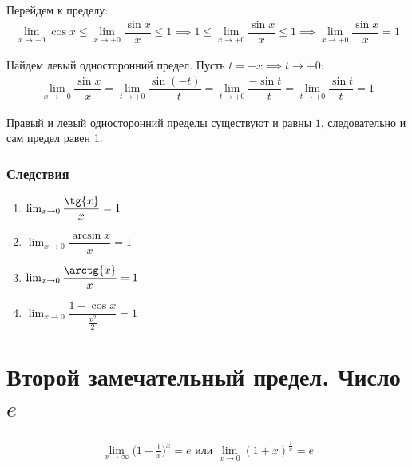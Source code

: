 \documentclass[a4paper,12pt,oneside]{extbook}
\theoremstyle{numbered}
\theoremstyle{unnumbered}
\theoremstyle{named}
\theoremstyle{unnumbered}
\theoremstyle{named}
\theoremstyle{named}
\theoremstyle{named}
\begin{document}
Перейдем к пределу:
\begin{gather*}
    \lim_{x \to +0}{\cos{x}} \leq \lim_{x \to +0}{\dfrac{\sin{x}}{x}} \leq 1 \implies 1 \leq \lim_{x \to +0}{\dfrac{\sin{x}}{x}} \leq 1 \implies \lim_{x \to +0}{\dfrac{\sin{x}}{x}} = 1
\end{gather*}

Найдем левый односторонний предел. Пусть \(t = -x \implies t \to +0\):
\begin{gather*}
    \lim_{x \to -0}{\dfrac{\sin{x}}{x}} = \lim_{t \to +0}{\dfrac{\sin{(-t)}}{-t}} = \lim_{t \to +0}{\dfrac{-\sin{t}}{-t}} = \lim_{t \to +0}{\dfrac{\sin{t}}{t}} = 1
\end{gather*}

Правый и левый односторонний пределы существуют и равны \(1\), следовательно и сам предел равен 1.

\subsubsection{Следствия}
\begin{enumerate}
    \item {\(\lim_{x \to 0}{\dfrac{\tg{x}}{x}} = 1\)}
    \item {\(\lim_{x \to 0}{\dfrac{\arcsin{x}}{x}} = 1\)}
    \item {\(\lim_{x \to 0}{\dfrac{\arctg{x}}{x}} = 1\)}
    \item {\(\lim_{x \to 0}{\dfrac{1 - \cos{x}}{\frac{x^2}{2}}} = 1\)}
\end{enumerate}

\section{Второй замечательный предел. Число \(e\)}\label{sec:limit_2}
\begin{gather*}
    \lim_{x \to \infty}{\Big(1 + \frac{1}{x}\Big)^x} = e \text{ или } \lim_{x \to 0}{(1 + x)^\frac{1}{x}} = e
\end{gather*}
\end{document}
